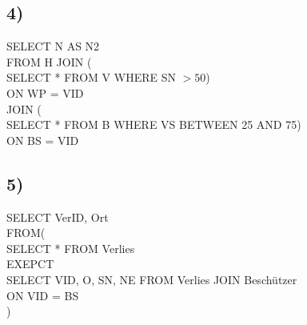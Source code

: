 \documentclass[a4paper,12pt]{article}
\begin{document}
\subsection*{4)}
SELECT N AS N2\\
\vspace{0.1em}\hspace{1em}FROM H JOIN ( \\
\vspace{0.1em}\hspace{4em}SELECT * FROM V WHERE SN $> 50$)\\
\vspace{0.1em}\hspace{2em}ON WP = VID\\
\vspace{0.1em}\hspace{1em}JOIN (\\
\vspace{0.1em}\hspace{4em}SELECT * FROM B WHERE VS BETWEEN 25 AND 75)\\
\vspace{0.1em}\hspace{2em}ON BS = VID\\

\subsection*{5)}
SELECT VerID, Ort\\
\vspace{0.1em}\hspace{1em}FROM(\\
\vspace{0.1em}\hspace{2em}SELECT * FROM Verlies\\
\vspace{0.1em}\hspace{2em}EXEPCT\\
\vspace{0.1em}\hspace{2em}SELECT VID, O, SN, NE FROM Verlies JOIN Beschützer\\
\vspace{0.1em}\hspace{3em}ON VID = BS\\
\vspace{0.1em}\hspace{2em})\\
\end{document}
